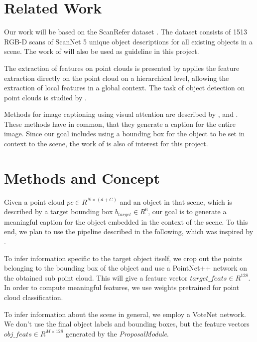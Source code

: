 \documentclass[10pt,twocolumn,letterpaper]{article}
\begin{document}
\section{Related Work}
Our work will be based on the ScanRefer dataset \cite{Chen2019}. The dataset consists of 1513 RGB-D scans of ScanNet\cite{Dai2017} 5 unique object descriptions for all existing objects in a scene. The work of \cite{Chen2019} will also be used as guideline in this project.

The extraction of features on point clouds is presented by \cite{Qi2017} applies the feature extraction directly on the point cloud on a hierarchical level, allowing the extraction of local features in a global context. 
The task of object detection on point clouds is studied by \cite{Qi2019}. 

Methods for image captioning using visual attention are described by \cite{Xu2015}, \cite{Lu2016} and \cite{Anderson2017}.
These methods have in common, that they generate a caption for the entire image.
Since our goal includes using a bounding box for the object to be set in context to the scene, the work of \cite{Rohrbach2015} is also of interest for this project. 

\section{Methods and Concept}

Given a point cloud $\mathit{pc \in R^{N\times(d+C)}}$ and an object in that scene, which is described by a target bounding box $b_{target}\in R^6$, our goal is to generate a meaningful caption for the object embedded in the context of the scene. To this end, we plan to use the pipeline described in the following, which was inspired by \cite{Anderson2017}.

To infer information specific to the target object itself, we crop out the points belonging to the bounding box of the object and use a PointNet++ \cite{Qi2017} network on the obtained sub point cloud. This will give a feature vector $\mathit{target\_feats}\in R^{128}$. In order to compute meaningful features, we use weights pretrained for point cloud classification.

To infer information about the scene in general, we employ a VoteNet \cite{Qi2019} network. We don't use the final object labels and bounding boxes, but the feature vectors $\mathit{obj\_feats}\in R^{M\times128}$ generated by the \textit{ProposalModule}.
\end{document}
